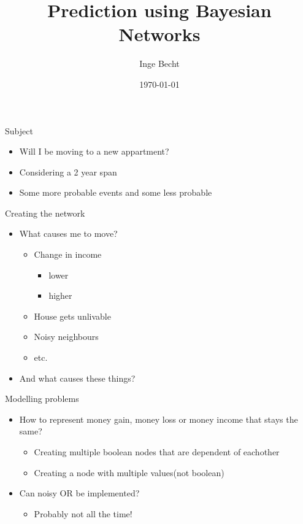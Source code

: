 \documentclass{beamer}
\begin{document}
\title{Prediction using Bayesian Networks}
\author{Inge Becht}
\date{\today}


\begin{frame}
  \titlepage
\end{frame}

\begin{frame}{Subject}
    \begin{itemize}
        \item{
                Will I be moving to a new appartment?
            }
        \item{ Considering a 2 year span}
        \item{ Some more probable events and some less probable}
    \end{itemize}
\end{frame}


\begin{frame}{Creating the network}
    \begin{itemize}
        \item What causes me to move?
            \begin{itemize}
                \item Change in income
                    \begin{itemize}
                        \item lower
                        \item higher
                    \end{itemize}
                \item House gets unlivable
                \item Noisy neighbours
                \item etc.
            \end{itemize}
        \item And what causes these things?
    \end{itemize}
\end{frame}


\begin{frame}{Modelling problems}
    \begin{itemize}
        \item How to represent money gain, money loss or money income that stays
            the same?
            \begin{itemize}
                \item Creating multiple boolean nodes that are dependent of
                    eachother 
                \item Creating a node with multiple values(not boolean)
            \end{itemize}
        \item Can noisy OR be implemented?
            \begin{itemize}
                \item Probably not all the time!
            \end{itemize}
    \end{itemize}
\end{frame}
\end{document}
